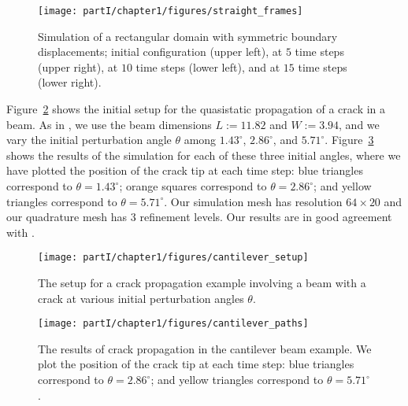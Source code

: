 \setlength{\figurewidth}{\textwidth}
\begin{figure}[htbp]
\centering
\texttt{[image: partI/chapter1/figures/straight\_frames]}
\caption{Simulation of a rectangular domain with symmetric boundary displacements; initial configuration (upper left), at $5$ time steps (upper right), at $10$ time steps (lower left), and at $15$ time steps (lower right).}
\label{fig:chap1.examples.propagation.straight}
\end{figure}

Figure~\ref{fig:chap1.examples.propagation.cantilever.setup} shows the initial setup for the quasistatic propagation of a crack in a beam. As in \cite{Belytschko99}, we use the beam dimensions $L := 11.82$ and $W := 3.94$, and we vary the initial perturbation angle $\theta$ among $1.43^{\circ}$, $2.86^{\circ}$, and $5.71^{\circ}$. Figure~\ref{fig:chap1.examples.propagation.cantilever.results} shows the results of the simulation for each of these three initial angles, where we have plotted the position of the crack tip at each time step: blue triangles correspond to $\theta = 1.43^{\circ}$; orange squares correspond to $\theta = 2.86^{\circ}$; and yellow triangles correspond to $\theta = 5.71^{\circ}$. Our simulation mesh has resolution $64 \times 20$ and our quadrature mesh has $3$ refinement levels. Our results are in good agreement with \cite{Belytschko99}.

\setlength{\figurewidth}{0.33\textwidth}
\begin{figure}[htbp]
\centering
\texttt{[image: partI/chapter1/figures/cantilever\_setup]}
\caption{The setup for a crack propagation example involving a beam with a crack at various initial perturbation angles $\theta$.}
\label{fig:chap1.examples.propagation.cantilever.setup}
\end{figure}

\setlength{\figurewidth}{\textwidth}
\begin{figure}[htbp]
\centering
\texttt{[image: partI/chapter1/figures/cantilever\_paths]}
\caption{The results of crack propagation in the cantilever beam example. We plot the position of the crack tip at each time step: blue triangles correspond to $\theta = 2.86^{\circ}$; and yellow triangles correspond to $\theta = 5.71^{\circ}$.}
 \label{fig:chap1.examples.propagation.cantilever.results}
\end{figure}


